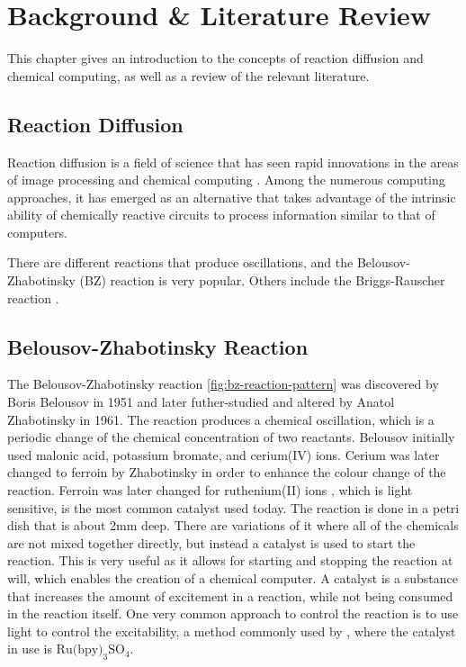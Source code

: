 \chapter{Background \& Literature Review} \label{ch:background-lit-review}
This chapter gives an introduction to the concepts of reaction diffusion and chemical computing,  as well as a review of the relevant literature.

\section{Reaction Diffusion}

Reaction diffusion is a field of science that has seen rapid innovations in the areas of image processing \citep{kuhnert1989image} and chemical computing \citep{dittrich2004chemical}. Among the numerous computing approaches, it has emerged as an alternative that takes advantage of the intrinsic ability of chemically reactive circuits to process information similar to that of computers. 

There are different reactions that produce oscillations, and the Belousov-Zhabotinsky (BZ) reaction is very popular. Others include the Briggs-Rauscher reaction \citep{de1982mechanistic}.
\section{Belousov-Zhabotinsky Reaction}
The Belousov-Zhabotinsky reaction \ref{fig:bz-reaction-pattern} was discovered by Boris Belousov in 1951 and later futher-studied and altered by Anatol Zhabotinsky in 1961. The reaction produces a chemical oscillation, which is a periodic change of the chemical concentration of two reactants. 
Belousov initially used malonic acid, potassium bromate, and cerium(IV) ions. Cerium was later changed to ferroin by Zhabotinsky in order to enhance the colour change of the reaction.
Ferroin was later changed for ruthenium(II) ions \citep{toth2006tris}, which is light sensitive, is the most common catalyst used today. The reaction is done in a petri dish that is about 2mm deep. 
There are variations of it where all of the chemicals are not mixed together directly, but instead a catalyst is used to start the reaction.
This is very useful as it allows for starting and stopping the reaction at will, which enables the creation of a chemical computer.
A catalyst is a substance that increases the amount of excitement in a reaction, while not being consumed in the reaction itself.
One very common approach to control the reaction is to use light to control the excitability, a method commonly used by \cite{gorecki2003chemical}, where the catalyst in use is $\text{Ru(bpy)}_3\text{SO}_4$.

